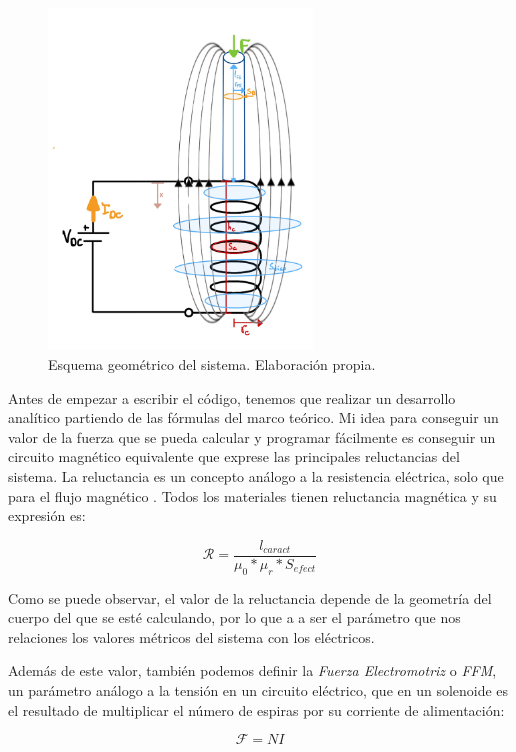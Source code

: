 \begin{figure}[H]
    \centering
    \includegraphics[width=7cm]{FigurasMemoria/esquemaDesTeor.png}
    \caption{Esquema geométrico del sistema. Elaboración propia.}
    \label{fig:esquemaDesTeor} %
\end{figure}

Antes de empezar a escribir el código, tenemos que realizar un desarrollo analítico partiendo de las fórmulas del marco teórico. Mi idea para conseguir un valor de la fuerza que se pueda calcular y programar fácilmente es conseguir un circuito magnético equivalente que exprese las principales reluctancias del sistema. La reluctancia es un concepto análogo a la resistencia eléctrica, solo que para el flujo magnético \citep{hughes2005electrical}. Todos los materiales tienen reluctancia magnética y su expresión es:

\begin{center}
    \[\mathcal{R} = \frac{l_{caract}}{\mu_0*\mu_r*S_{efect}}\]
\end{center}

Como se puede observar, el valor de la reluctancia depende de la geometría del cuerpo del que se esté calculando, por lo que a a ser el parámetro que nos relaciones los valores métricos del sistema con los eléctricos.

Además de este valor, también podemos definir la \textit{Fuerza Electromotriz} o \textit{FFM}, un parámetro análogo a la tensión en un circuito eléctrico, que en un solenoide es el resultado de multiplicar el número de espiras por su corriente de alimentación:

\begin{center}
    \[\mathcal{F}=NI\]
\end{center}


